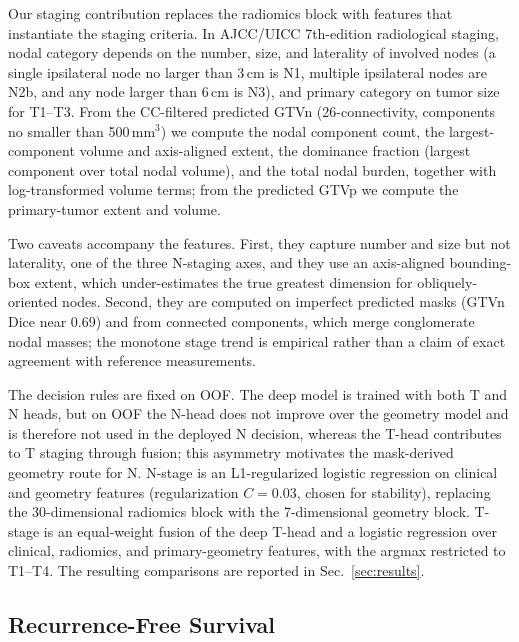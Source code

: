 \documentclass[runningheads]{llncs}
\begin{document}
Our staging contribution replaces the radiomics block with features that instantiate the staging criteria. In AJCC/UICC 7th-edition radiological staging, nodal category depends on the number, size, and laterality of involved nodes (a single ipsilateral node no larger than 3\,cm is N1, multiple ipsilateral nodes are N2b, and any node larger than 6\,cm is N3), and primary category on tumor size for T1--T3. From the CC-filtered predicted GTVn (26-connectivity, components no smaller than 500\,mm$^3$) we compute the nodal component count, the largest-component volume and axis-aligned extent, the dominance fraction (largest component over total nodal volume), and the total nodal burden, together with log-transformed volume terms; from the predicted GTVp we compute the primary-tumor extent and volume.

Two caveats accompany the features. First, they capture number and size but not laterality, one of the three N-staging axes, and they use an axis-aligned bounding-box extent, which under-estimates the true greatest dimension for obliquely-oriented nodes. Second, they are computed on imperfect predicted masks (GTVn Dice near 0.69) and from connected components, which merge conglomerate nodal masses; the monotone stage trend is empirical rather than a claim of exact agreement with reference measurements.

The decision rules are fixed on OOF. The deep model is trained with both T and N heads, but on OOF the N-head does not improve over the geometry model and is therefore not used in the deployed N decision, whereas the T-head contributes to T staging through fusion; this asymmetry motivates the mask-derived geometry route for N. N-stage is an L1-regularized logistic regression on clinical and geometry features (regularization $C=0.03$, chosen for stability), replacing the 30-dimensional radiomics block with the 7-dimensional geometry block. T-stage is an equal-weight fusion of the deep T-head and a logistic regression over clinical, radiomics, and primary-geometry features, with the argmax restricted to T1--T4. The resulting comparisons are reported in Sec.~\ref{sec:results}.
\subsection{Recurrence-Free Survival}
\label{sec:rfs}
\end{document}
